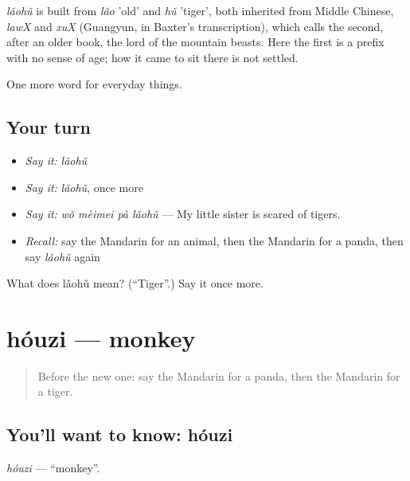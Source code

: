 \begin{cousinweb}
\emph{lǎohǔ} is built from \emph{lǎo} 'old' and \emph{hǔ} 'tiger', both inherited from Middle Chinese, \emph{lawX} and \emph{xuX} (Guangyun, in Baxter's transcription), which calls the second, after an older book, the lord of the mountain beasts. Here the first is a prefix with no sense of age; how it came to sit there is not settled.
\end{cousinweb}

\begin{grammarlens}[title={What you've built}]
One more word for everyday things.
\end{grammarlens}

\subsection*{Your turn}
\begin{itemize}
\raggedright
  \item \emph{Say it:} \emph{lǎohǔ}
  \item \emph{Say it:} \emph{lǎohǔ}, once more
  \item \emph{Say it:} \emph{wǒ mèimei pà lǎohǔ} — My little sister is scared of tigers.
  \item \emph{Recall:} say the Mandarin for an animal, then the Mandarin for a panda, then say \emph{lǎohǔ} again
\end{itemize}

\begin{tcolorbox}[breakable,colback=teal!4,colframe=teal!35!black,title={Before you move on}]
What does lǎohǔ mean? (\textquotedblleft{}Tiger\textquotedblright{}.) Say it once more.
\end{tcolorbox}
\section[hóuzi]{hóuzi — monkey}

\label{lesson:ZH-C223-houzi}



\begin{quote}
Before the new one: say the Mandarin for a panda, then the Mandarin for a tiger.
\end{quote}

\subsection*{You'll want to know: hóuzi}
\emph{hóuzi} — \textquotedblleft{}monkey\textquotedblright{}.

